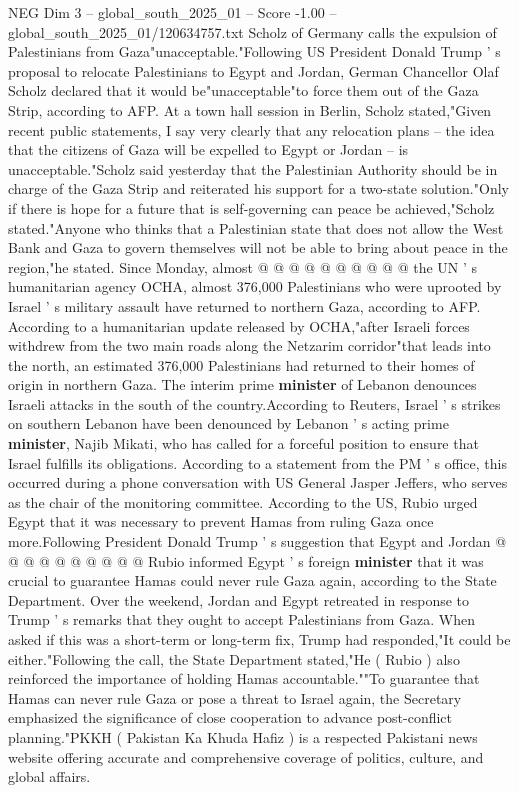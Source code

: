 \begin{textsample}{NEG Dim 3 – global\_south\_2025\_01 – Score -1.00 – global\_south\_2025\_01/120634757.txt}  \label{ex:f3_neg_054}
Scholz of Germany calls the expulsion of Palestinians from Gaza"unacceptable."Following US President Donald Trump ' s proposal to relocate Palestinians to Egypt and Jordan, German Chancellor Olaf Scholz declared that it would be"unacceptable"to force them out of the Gaza Strip, according to AFP.
At a town hall session in Berlin, Scholz stated,"Given recent public statements, I say very clearly that any relocation plans -- the idea that the citizens of Gaza will be expelled to Egypt or Jordan -- is unacceptable."Scholz said yesterday that the Palestinian Authority should be in charge of the Gaza Strip and reiterated his support for a two-state solution."Only if there is hope for a future that is self-governing can peace be achieved,"Scholz stated."Anyone who thinks that a Palestinian state that does not allow the West Bank and Gaza to govern themselves will not be able to bring about peace in the region,"he stated.
Since Monday, almost @ @ @ @ @ @ @ @ @ @ the UN ' s humanitarian agency OCHA, almost 376,000 Palestinians who were uprooted by Israel ' s military assault have returned to northern Gaza, according to AFP.
According to a humanitarian update released by OCHA,"after Israeli forces withdrew from the two main roads along the Netzarim corridor"that leads into the north, an estimated 376,000 Palestinians had returned to their homes of origin in northern Gaza.
The interim prime \textbf{minister} of Lebanon denounces Israeli attacks in the south of the country.According to Reuters, Israel ' s strikes on southern Lebanon have been denounced by Lebanon ' s acting prime \textbf{minister}, Najib Mikati, who has called for a forceful position to ensure that Israel fulfills its obligations.
According to a statement from the PM ' s office, this occurred during a phone conversation with US General Jasper Jeffers, who serves as the chair of the monitoring committee.
According to the US, Rubio urged Egypt that it was necessary to prevent Hamas from ruling Gaza once more.Following President Donald Trump ' s suggestion that Egypt and Jordan @ @ @ @ @ @ @ @ @ @ Rubio informed Egypt ' s foreign \textbf{minister} that it was crucial to guarantee Hamas could never rule Gaza again, according to the State Department.
Over the weekend, Jordan and Egypt retreated in response to Trump ' s remarks that they ought to accept Palestinians from Gaza.
When asked if this was a short-term or long-term fix, Trump had responded,"It could be either."Following the call, the State Department stated,"He ( Rubio ) also reinforced the importance of holding Hamas accountable.""To guarantee that Hamas can never rule Gaza or pose a threat to Israel again, the Secretary emphasized the significance of close cooperation to advance post-conflict planning."PKKH ( Pakistan Ka Khuda Hafiz ) is a respected Pakistani news website offering accurate and comprehensive coverage of politics, culture, and global affairs.

\end{textsample}
